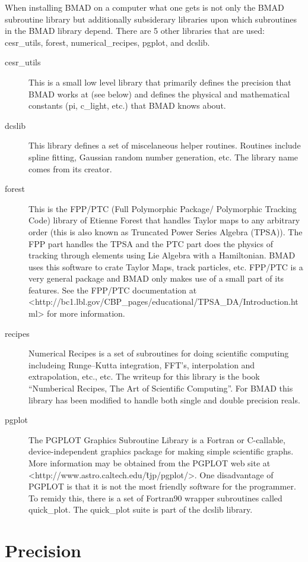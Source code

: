 \documentclass{book}
\begin{document}
When installing BMAD on a computer what one gets is not only the BMAD
subroutine library but additionally subsiderary libraries upon which
subroutines in the BMAD library depend. There are 5 other libraries
that are used: cesr\_utils, forest, numerical\_recipes, pgplot, and dcslib.
\begin{description}
\item[cesr\_utils] This is a small low level library that primarily defines 
the precision that BMAD works at (see below) and defines the physical
and mathematical constants (pi, c\_light, etc.) that BMAD knows
about.
\item[dcslib] This library defines a set of miscelaneous helper routines. 
Routines include spline fitting, Gaussian random number generation,
etc. The library name comes from its creator.
\item[forest] This is the FPP/PTC 
(Full Polymorphic Package/ Polymorphic Tracking Code) library of
Etienne Forest that handles Taylor maps to any arbitrary order (this
is also known as Truncated Power Series Algebra (TPSA)). The FPP part
handles the TPSA and the PTC part does the physics of tracking through
elements using Lie Algebra with a Hamiltonian.  BMAD uses this
software to crate Taylor Maps, track particles, etc.  FPP/PTC is a
very general package and BMAD only makes use of a small part of its
features. See the FPP/PTC documentation at
<http://bc1.lbl.gov/CBP\_pages/educational/TPSA\_DA/Introduction.html>
for more information.
\item[recipes] Numerical Recipes is a set of subroutines for doing 
scientific computing includeing Runge--Kutta integration, FFT's,
interpolation and extrapolation, etc., etc. The writeup for this
library is the book ``Numberical Recipes, The Art of Scientific
Computing''\cite{?}. For BMAD this library has been modified to handle
both single and double precision reals.
\item[pgplot] The PGPLOT Graphics Subroutine Library is a Fortran or 
C-callable, device-independent graphics package for making simple
scientific graphs. More information may be obtained from the PGPLOT
web site at <http://www.astro.caltech.edu/\~tjp/pgplot/>. One
disadvantage of PGPLOT is that it is not the most friendly software
for the programmer. To remidy this, there is a set of Fortran90
wrapper subroutines called quick\_plot. The quick\_plot suite is part
of the dcslib library.
\end{description}

\section{Precision}
\end{document}
